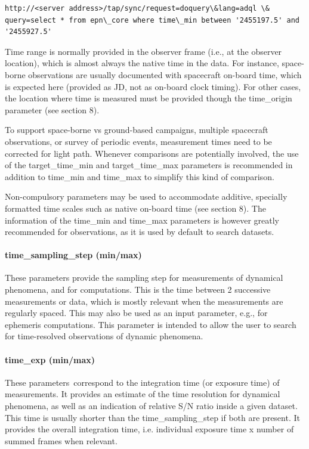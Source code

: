 \documentclass[11pt,a4paper]{ivoa}
\begin{document}
\begin{verbatim}http://<server address>/tap/sync/request=doquery\&lang=adql \& query=select * from epn\_core where time\_min between '2455197.5' and '2455927.5'\end{verbatim}




Time range is normally provided in the observer frame (i.e., at the observer location), which is almost always the native time in the data. For instance, space-borne observations are usually documented with spacecraft on-board time, which is expected here (provided as JD, not as on-board clock timing). For other cases, the location where time is measured must be provided though the time\_origin parameter (see section 8).

To support space-borne vs ground-based campaigns, multiple spacecraft observations, or survey of periodic events, measurement times need to be corrected for light path. Whenever comparisons are potentially involved, the use of the target\_time\_min and target\_time\_max parameters is recommended in addition to time\_min and time\_max to simplify this kind of comparison.

Non-compulsory parameters may be used to accommodate additive, specially formatted time scales such as native on-board time (see section 8). The information of the time\_min and time\_max parameters is however greatly recommended for observations, as it is used by default to search datasets.

\paragraph{time\_sampling\_step (min/max)}

These parameters provide the sampling step for measurements of dynamical phenomena, and for computations. This is the time between 2 successive measurements or data, which is mostly relevant when the measurements are regularly spaced. This may also be used as an input parameter, e.g., for ephemeris computations. This parameter is intended to allow the user to search for time-resolved observations of dynamic phenomena.

\paragraph{time\_exp (min/max)}

These parameters correspond to the integration time (or exposure time) of measurements. It provides an estimate of the time resolution for dynamical phenomena, as well as an indication of relative S/N ratio inside a given dataset. This time is usually shorter than the time\_sampling\_step if both are present. It provides the overall integration time, i.e. individual exposure time x number of summed frames when relevant. 
\end{document}
